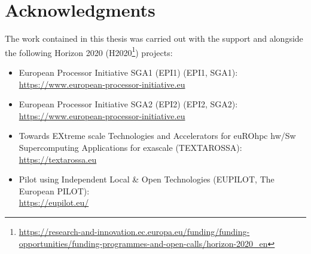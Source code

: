 \section{Acknowledgments}
The work contained in this thesis was carried out with the support and alongside  the following  Horizon 2020 (H2020\footnote{\url{https://research-and-innovation.ec.europa.eu/funding/funding-opportunities/funding-programmes-and-open-calls/horizon-2020_en}}) projects:
\begin{itemize}
    \item European Processor Initiative SGA1 (EPI1) (EPI1, SGA1): \\\url{https://www.european-processor-initiative.eu}
    \item European Processor Initiative SGA2 (EPI2) (EPI2, SGA2): \\\url{https://www.european-processor-initiative.eu}
    \item Towards EXtreme scale Technologies and Accelerators for euROhpc hw/Sw Supercomputing Applications for exascale (TEXTAROSSA): \\\url{https://textarossa.eu}
    \item Pilot using Independent Local \& Open Technologies (EUPILOT, The European PILOT): \\\url{https://eupilot.eu/}
\end{itemize}